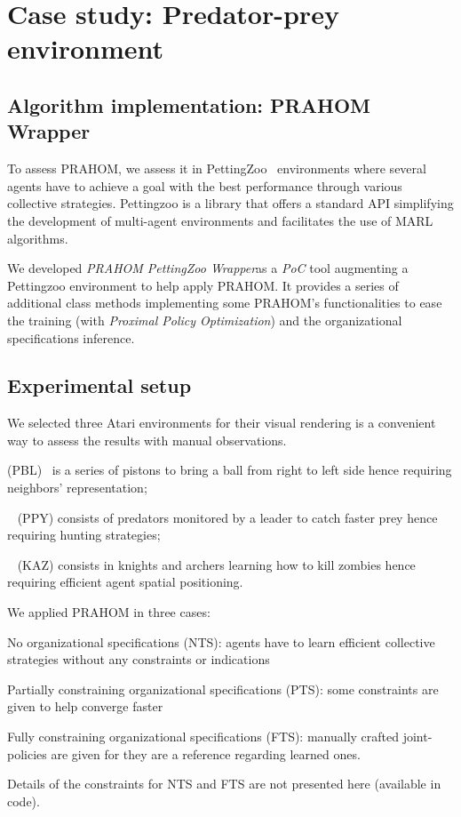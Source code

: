 \documentclass[runningheads]{llncs}
\begin{document}
\section{Case study: Predator-prey environment}

\subsection{Algorithm implementation: PRAHOM Wrapper}


To assess PRAHOM, we assess it in PettingZoo~\cite{Terry2021} environments where several agents have to achieve a goal with the best performance through various collective strategies. Pettingzoo is a library that offers a standard API simplifying the development of multi-agent environments and facilitates the use of MARL algorithms.

We developed \emph{PRAHOM PettingZoo Wrapper}\footnotemark[2] as a \emph{PoC} tool augmenting a Pettingzoo environment to help apply PRAHOM. It provides a series of additional class methods implementing some PRAHOM's functionalities to ease the training (with \emph{Proximal Policy Optimization}) and the organizational specifications inference.

\subsection{Experimental setup}

We selected three Atari environments for their visual rendering is a convenient way to assess the results with manual observations\footnotemark[1].
\begin{enumerate*}[label=\roman*),itemjoin={;\quad}]
    \item {} (PBL)~\cite{Terry2021} is a series of pistons to bring a ball from right to left side hence requiring neighbors' representation;
    \item {}~\cite{Lowe2017} (PPY) consists of predators monitored by a leader to catch faster prey hence requiring hunting strategies;
    \item {}~\cite{Terry2021} (KAZ) consists in knights and archers learning how to kill zombies hence requiring efficient agent spatial positioning.
\end{enumerate*}
%
We applied PRAHOM in three cases:
\begin{enumerate*}[label=\roman*),itemjoin={;\quad}]
    \item No organizational specifications (NTS): agents have to learn efficient collective strategies without any constraints or indications
    \item Partially constraining organizational specifications (PTS): some constraints are given to help converge faster
    \item Fully constraining organizational specifications (FTS): manually crafted joint-policies are given for they are a reference regarding learned ones.
\end{enumerate*}
%
Details of the constraints for NTS and FTS are not presented here (available in code\footnotemark[1]).
\end{document}
